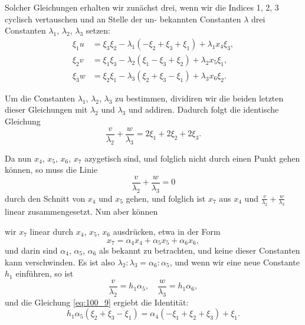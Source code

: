 \documentclass[12pt,a4paper]{article}
\theoremstyle{plain}
\theoremstyle{definition}
\theoremstyle{remark}
\begin{document}
Solcher Gleichungen erhalten wir zunächst drei, wenn wir
die Indices 1, 2, 3 cyclisch vertauschen und an Stelle der un-
bekannten Constanten $\lambda$ drei Constanten $\lambda_1$, $\lambda_2$, $\lambda_3$ setzen:
\begin{equation}\label{eq:100_8}
\begin{aligned}
\xi_1 u &= \xi_3 \xi_2 - \lambda_1(-\xi_2 + \xi_3 + \xi_1) + \lambda_1 x_4 \xi_3, \\
\xi_2 v &= \xi_1 \xi_3 - \lambda_2(\xi_1 - \xi_3 + \xi_2) + \lambda_2 x_5 \xi_1, \\
\xi_3 w &= \xi_2 \xi_1 - \lambda_3(\xi_2 + \xi_3 - \xi_1) + \lambda_3 x_6 \xi_2.
\end{aligned}
\end{equation}

Um die Constanten $\lambda_1$, $\lambda_2$, $\lambda_3$ zu bestimmen, dividiren wir
die beiden letzten dieser Gleichungen mit $\lambda_2$ und $\lambda_3$ und addiren.
Dadurch folgt die identische Gleichung
\begin{equation*}\label{eq:100_9}
\frac{v}{\lambda_2} + \frac{w}{\lambda_3} = 2\xi_1 + 2\xi_2 + 2\xi_3.
\end{equation*}

Da nun $x_4$, $x_5$, $x_6$, $x_7$ azygetisch sind, und folglich nicht durch
einen Punkt gehen können, so muss die Linie
\begin{equation*}
\frac{v}{\lambda_2} + \frac{w}{\lambda_3} = 0
\end{equation*}
durch den Schnitt von $x_4$ und $x_5$ gehen, und folglich ist $x_7$ aus
$x_4$ und $\frac{v}{\lambda_2} + \frac{w}{\lambda_3}$ linear zusammengesetzt. Nun aber können

wir $x_7$ linear durch $x_4$, $x_5$, $x_6$ ausdrücken, etwa in der Form
\begin{equation}\label{eq:100_10}
x_7 = \alpha_4 x_4 + \alpha_5 x_5 + \alpha_6 x_6,
\end{equation}
und darin sind $\alpha_4$, $\alpha_5$, $\alpha_6$ als bekannt zu betrachten, und keine
dieser Constanten kann verschwinden. Es ist also $\lambda_2 : \lambda_3 = \alpha_6 : \alpha_5$,
und wenn wir eine neue Constante $h_1$ einführen, so ist
\begin{equation}\label{eq:100_11}
\frac{v}{\lambda_2} = h_1 \alpha_5, \quad \frac{w}{\lambda_3} = h_1 \alpha_6,
\end{equation}
und die Gleichung \eqref{eq:100_9} ergiebt die Identität:
\begin{equation*}\label{eq:100_12}
h_1 \alpha_5(\xi_2 + \xi_3 - \xi_1) = \alpha_4(-\xi_1 + \xi_2 + \xi_3) + \xi_1.
\end{equation*}
\end{document}
